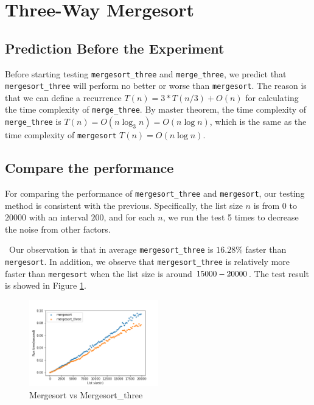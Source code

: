 \documentclass[12pt]{article}
\begin{document}
\section{Three-Way Mergesort}
\subsection{Prediction Before the Experiment}
Before starting testing \verb|mergesort_three| and \verb|merge_three|, we predict that \verb|mergesort_three| will perform no better or worse than \verb|mergesort|. The reason is that we can define a recurrence $T(n) = 3 * T(n/3) + O(n)$ for calculating the time complexity of \verb|merge_three|. By master theorem, the time complexity of \verb|merge_three| is $T(n) = O(n \log_3 n) = O(n \log n)$, which is the same as the time complexity of \verb|mergesort| $T(n) = O(n \log n)$.
\subsection{Compare the performance}
For comparing the performance of \verb|mergesort_three| and \verb|mergesort|, our testing method is consistent with the previous. Specifically, the list size $n$ is from $0$ to $20000$ with an interval $200$, and for each $n$, we run the test 5 times to decrease the noise from other factors. 

~\newline\noindent Our observation is that in average \verb|mergesort_three| is $16.28\% $ faster than \verb|mergesort|. In addition, we observe that  \verb|mergesort_three| is relatively more faster than  \verb|mergesort| when the list size is around $15000 \-- 20000$. The test result is showed in Figure \ref{Figure: mergesort_three}.

\begin{figure}[h!]
\centering
\includegraphics[width=0.5\textwidth,height=\textheight,keepaspectratio]{Figures/mergesort_vs_mergesort_three.png}
\caption{Mergesort vs Mergesort\_three}
\label{Figure: mergesort_three}
\end{figure}
\end{document}
